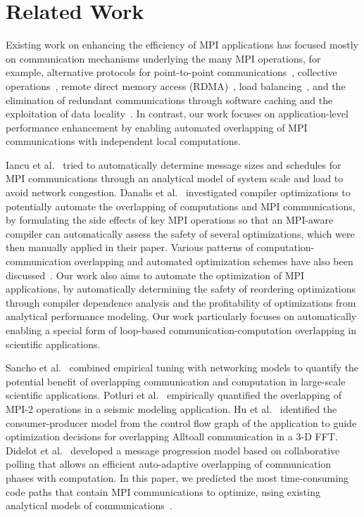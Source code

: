 \section{Related Work}
\label{sec-related}

Existing work on enhancing the efficiency of MPI applications has 
focused mostly on communication mechanisms underlying the many 
MPI operations, for example, alternative protocols for point-to-point
communications~\cite{brightwell:eurompi03,denis:eurompi11}, collective
operations~\cite{traff:eurompi14:ocd,traff:eurompi14:mcd,graham:eurompi08,mittal:ppopp12},
remote direct memory access
(RDMA)~\cite{liu:ics03,woodall:eurompi06,hatanaka:eurompi13}, load
balancing~\cite{nian:niss09,kale:eurompi14}, and the
elimination of redundant communications through software caching and
the exploitation of data
locality~\cite{buntinas:icpp09,isujita:eurompi14,ozog:ics13}.  In
contrast, our work focuses on application-level performance
enhancement by enabling automated overlapping of MPI communications
with independent local computations.

Iancu et al.~\cite{iancu:ppopp07} tried to automatically determine
message sizes and schedules for MPI communications through an
analytical model of system scale and load to avoid network congestion.
Danalis et al.~\cite{danalis:ics09} investigated compiler
optimizations to potentially automate the overlapping of 
computations and MPI communications, by formulating the side effects of key MPI operations so that
an MPI-aware compiler can automatically assess the safety of several
optimizations, which were then manually applied in their paper.
Various patterns of computation-communication overlapping and
automated optimization schemes have also been
discussed~\cite{danalis:sc05,fishgold:ipdps06}.  Our work also aims to automate the optimization
of MPI applications, by automatically determining the safety of reordering optimizations through compiler 
dependence analysis and the profitability of optimizations from 
analytical performance modeling. Our work particularly focuses on automatically enabling 
a special form of loop-based
communication-computation overlapping in scientific applications. 

Sancho et al.~\cite{sancho:sc06} combined empirical tuning with
networking models to quantify the potential benefit of overlapping
communication and computation in large-scale scientific applications.
Potluri et al.~\cite{potluri:ics10} empirically quantified the
overlapping of MPI-2 operations in a seismic modeling application.  Hu
et al.~\cite{hu:npc08,song:ppopp14} identified the consumer-producer
model from the control flow graph of the application to guide
optimization decisions for overlapping Alltoall communication in a 3-D
FFT.  Didelot et al.~\cite{didelot:imc14,didelot:eurompi12} developed
a message progression model based on collaborative polling that allows
an efficient auto-adaptive overlapping of communication phases with
computation.  In this paper, we predicted the most time-consuming
code paths that contain MPI communications to
optimize, using existing analytical models of
communications~\cite{loggp}.

